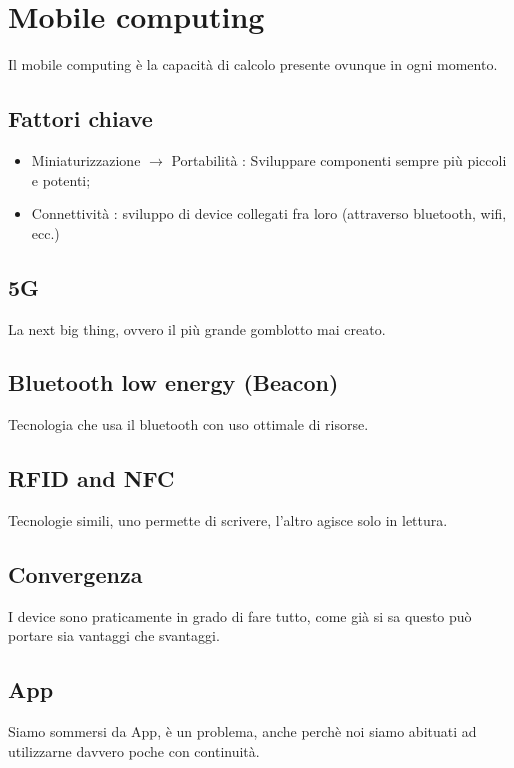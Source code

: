 \chapter{Mobile computing}

Il mobile computing è la capacità di calcolo presente ovunque in ogni momento.
\section{Fattori chiave}
\begin{itemize}
	\item Miniaturizzazione $\rightarrow$ Portabilità : Sviluppare componenti sempre più piccoli e potenti;
	\item Connettività : sviluppo di device collegati fra loro (attraverso bluetooth, wifi, ecc.)
\end{itemize}

\section{5G}
La next big thing, ovvero il più grande gomblotto mai creato.

\section{Bluetooth low energy (Beacon)}

Tecnologia che usa il bluetooth con uso ottimale di risorse.

\section{RFID and NFC}

Tecnologie simili, uno permette di scrivere, l'altro agisce solo in lettura.

\section{Convergenza}

I device sono praticamente in grado di fare tutto, come già si sa questo può portare sia vantaggi che svantaggi.

\section{App}

Siamo sommersi da App, è un problema, anche perchè noi siamo abituati ad utilizzarne davvero poche con continuità.

